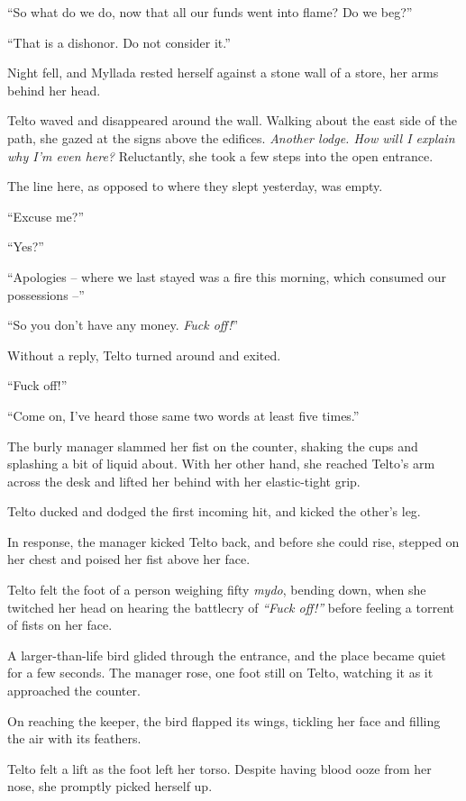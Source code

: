 ``So what do we do, now that all our funds went into flame? Do we beg?''

``That is a dishonor. Do not consider it.''

\centeredstars

Night fell, and Myllada rested herself against a stone wall of a store, her arms behind her head.

Telto waved and disappeared around the wall. Walking about the east side of the path, she gazed at the signs above the edifices. \emph{Another lodge. How will I explain why I'm even here?} Reluctantly, she took a few steps into the open entrance.

The line here, as opposed to where they slept yesterday, was empty.

``Excuse me?''

``Yes?''

``Apologies -- where we last stayed was a fire this morning, which consumed our possessions --''

``So you don't have any money. \emph{Fuck off!}''

Without a reply, Telto turned around and exited.

\centeredstars

``Fuck off!''

``Come on, I've heard those same two words at least five times.''

The burly manager slammed her fist on the counter, shaking the cups and splashing a bit of liquid about. With her other hand, she reached Telto's arm across the desk and lifted her behind with her elastic-tight grip.

Telto ducked and dodged the first incoming hit, and kicked the other's leg.

In response, the manager kicked Telto back, and before she could rise, stepped on her chest and poised her fist above her face.

Telto felt the foot of a person weighing fifty \emph{mydo}, bending down, when she twitched her head on hearing the battlecry of \emph{``Fuck off!''} before feeling a torrent of fists on her face.

A larger-than-life bird glided through the entrance, and the place became quiet for a few seconds. The manager rose, one foot still on Telto, watching it as it approached the counter.

On reaching the keeper, the bird flapped its wings, tickling her face and filling the air with its feathers.

Telto felt a lift as the foot left her torso. Despite having blood ooze from her nose, she promptly picked herself up.

